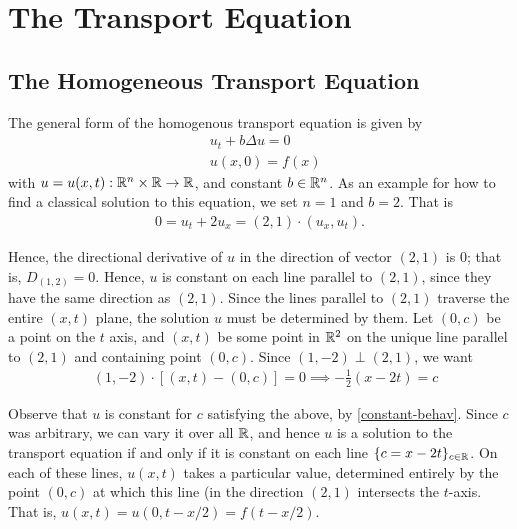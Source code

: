 \chapter{The Transport Equation}
\section{The Homogeneous Transport Equation}
The general form of the homogenous transport equation is given by
\begin{equation*}
\begin{split}
	& u_{t}  + b\Delta u = 0
	\\
	& u(x,0) = f(x)
\end{split}
\end{equation*}
with $u = u(x,t): \mathbb{R}^{n} \times \mathbb{R} \to \mathbb{R}$, and constant $b \in \mathbb{R}^n$.
As an example for how to find a classical solution to this equation, we set
$n = 1$ and $b=2$. That is
\begin{equation}
	\label{constant-behav}
\begin{split}
	0 = u_{t} + 2 u _{x} = (2,1) \cdot (u_{x}, u_{t}).
\end{split}
\end{equation}

Hence, the directional derivative of $u$ in the direction of vector $(2,1)$ is
0; that is, $D_{(1,2)} = 0$. Hence, $u$ is constant on each line parallel to
$(2,1)$, since they have the same direction as $(2,1)$. Since the lines parallel
to $(2,1)$ traverse the entire $(x,t)$ plane, the solution $u$ must be
determined by them. Let $(0,c)$ be a point on the $t$ axis, and $(x,t)$ be some
point in $\mathbb{R}^{2}$ on the unique line parallel to $(2,1)$ and containing point
$(0,c)$. Since $(1,-2) \perp (2,1)$, we want
\begin{equation*}
\begin{split}
	& (1,-2) \cdot \left[ (x,t) - (0,c) \right] = 0
	\implies -\frac{1}{2}(x-2t) = c
\end{split}
\end{equation*}

Observe that $u$ is constant for $c$ satisfying the above, by
\eqref{constant-behav}. Since $c$ was arbitrary, we can vary it over all $\mathbb{R}$,
and hence $u$ is a solution to the transport equation if and only if it is
constant on each line $\{ c = x-2t\}_{c \in \mathbb{R}}$.
On each of these lines, $u(x,t)$ takes a particular value, determined entirely
by the point $(0,c)$ at which this line (in the direction $(2,1)$ intersects the
$t$-axis. That is, $u(x,t) = u(0, t-x/2) = f(t-x/2)$.

